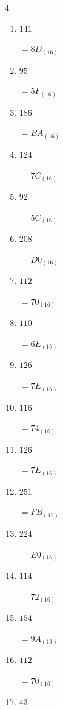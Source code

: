 \begin{multicols}{4}
\begin{enumerate}
  \item $141$

        $=8D_{(16)}$

  \item $95$

        $=5F_{(16)}$

  \item $186$

        $=BA_{(16)}$

  \item $124$

        $=7C_{(16)}$

  \item $92$

        $=5C_{(16)}$

  \item $208$

        $=D0_{(16)}$

  \item $112$

        $=70_{(16)}$

  \item $110$

        $=6E_{(16)}$

  \item $126$

        $=7E_{(16)}$

  \item $116$

        $=74_{(16)}$

  \item $126$

        $=7E_{(16)}$

\columnbreak %

  \item $251$

        $=FB_{(16)}$

  \item $224$

        $=E0_{(16)}$

  \item $114$

        $=72_{(16)}$

  \item $154$

        $=9A_{(16)}$

  \item $112$

        $=70_{(16)}$

  \item $43$


\end{enumerate}
\end{multicols}
